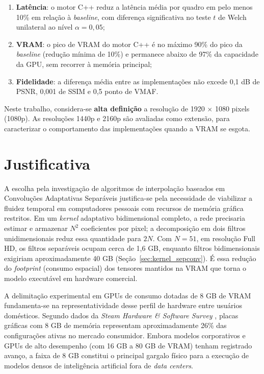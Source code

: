 \documentclass[
    12pt,                %
    openright,           %
    oneside,             %
    a4paper,             %
    english,             %
    brazil               %
]{abntex2}
\begin{document}
\begin{enumerate}
    \item[\textbf{H1}] \textbf{Latência}: o motor C++ reduz a latência média por quadro em pelo menos 10\% em relação à \textit{baseline}, com diferença significativa no teste $t$ de Welch unilateral ao nível $\alpha = 0{,}05$;
    \item[\textbf{H2}] \textbf{VRAM}: o pico de VRAM do motor C++ é no máximo 90\% do pico da \textit{baseline} (redução mínima de 10\%) e permanece abaixo de 97\% da capacidade da GPU, sem recorrer à memória principal;
    \item[\textbf{H3}] \textbf{Fidelidade}: a diferença média entre as implementações não excede 0,1 dB de PSNR, 0,001 de SSIM e 0,5 ponto de VMAF.
\end{enumerate}

Neste trabalho, considera-se \textbf{alta definição} a resolução de 1920 $\times$ 1080 pixels (1080p). As resoluções 1440p e 2160p são avaliadas como extensão, para caracterizar o comportamento das implementações quando a VRAM se esgota.

\section{Justificativa}
\label{sec:justificativa}

A escolha pela investigação de algoritmos de interpolação baseados em Convoluções Adaptativas Separáveis justifica-se pela necessidade de viabilizar a fluidez temporal em computadores pessoais com recursos de memória gráfica restritos. Em um \textit{kernel} adaptativo bidimensional completo, a rede precisaria estimar e armazenar $N^2$ coeficientes por pixel; a decomposição em dois filtros unidimensionais reduz essa quantidade para $2N$. Com $N = 51$, em resolução Full HD, os filtros separáveis ocupam cerca de 1,6 GB, enquanto filtros bidimensionais exigiriam aproximadamente 40 GB (Seção~\ref{sec:kernel_sepconv}). É essa redução do \textit{footprint} (consumo espacial) dos tensores mantidos na VRAM que torna o modelo executável em hardware comercial.

A delimitação experimental em GPUs de consumo dotadas de 8 GB de VRAM fundamenta-se na representatividade desse perfil de hardware entre usuários domésticos. Segundo dados da \textit{Steam Hardware \& Software Survey} \cite{SteamSurvey2026}, placas gráficas com 8 GB de memória representam aproximadamente 26\% das configurações ativas no mercado consumidor. Embora modelos corporativos e GPUs de alto desempenho (com 16 GB a 80 GB de VRAM) tenham registrado avanço, a faixa de 8 GB constitui o principal gargalo físico para a execução de modelos densos de inteligência artificial fora de \textit{data centers}.
\end{document}
